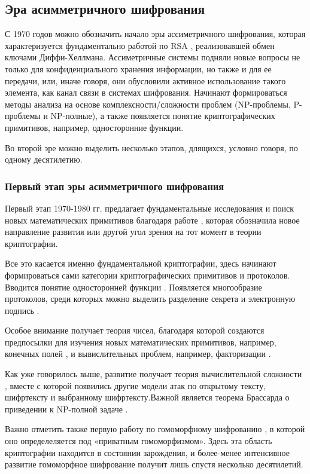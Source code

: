    \subsection{Эра асимметричного шифрования} \label{subsec:ch1/sec1/sub2}

    \color{Blue}С 1970 годов можно обозначить начало эры ассиметричного шифрования, которая характеризуется фундаментально работой по RSA \cite{RSA-78}, реализовавшей обмен ключами Диффи-Хеллмана. Ассиметричные системы подняли новые вопросы не только для конфиденциального хранения информации, но также и для ее передачи, или, иначе говоря, они обусловили активное использование такого элемента, как канал связи в системах шифрования. Начинают формироваться методы анализа на основе комплексности/сложности проблем (NP-проблемы, P-проблемы и NP-полные), а также появляется понятие криптографических примитивов, например, односторонние функции. \cite{NewDirs-76}\par
    \color{ProcessBlue}Во второй эре можно выделить несколько этапов, длящихся, условно говоря, по одному десятилетию.\par

    \subsubsection{Первый этап эры асимметричного шифрования}

     Первый этап  1970-1980 гг. предлагает фундаментальные исследования и поиск новых математических примитивов благодаря работе \cite{NewDirs-76}, которая обозначила новое направление развития или другой угол зрения на тот момент в теории криптографии.\par
     Все это касается именно фундаментальной криптографии, здесь начинают формироваться сами категории криптографических примитивов и протоколов. Вводится понятие односторонней функции \cite{NewDirs-76}. Появляется многообразие протоколов, среди которых можно выделить разделение секрета \cite{ShamirShare-79} и электронную подпись \cite{DigSign-79}.\par
     Особое внимание получает теория чисел, благодаря которой \cite{NewDirs-76} создаются  предпосылки для изучения новых математических примитивов, например, конечных полей \cite{TakingRootsInFinite-77}, и вывислительных проблем, например, факторизации \cite{RSA-78}.\par
     Как уже говорилось выше, развитие получает теория вычислительной сложности \cite{ReduceNP-72}, вместе с которой появились другие модели атак по открытому тексту, шифртексту и выбранному шифртексту.\color{Red}Важной является теорема Брассарда о приведении к NP-полной задаче \cite{Brassard-79}.\par
     \color{Blue}Важно отметить также первую работу по гомоморфному шифрованию \cite{OnPrivData-78}, в которой оно определеляется под «приватным гомоморфизмом». Здесь эта область криптографии находится в состоянии зарождения, и более-менее интенсивное развитие гомоморфное шифрование получит лишь спустя несколько десятилетий.\par

